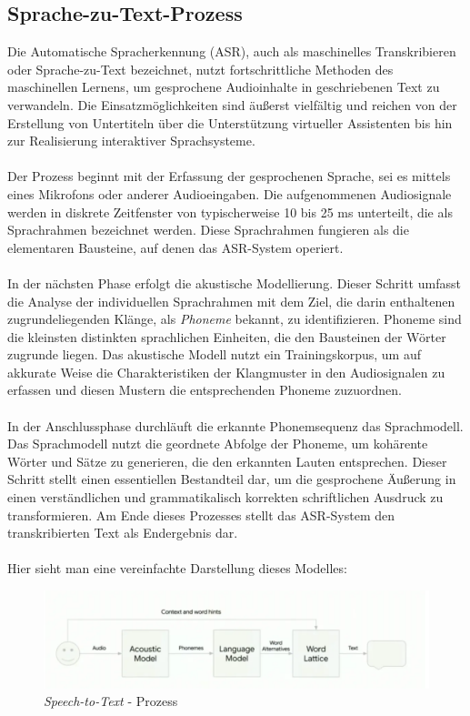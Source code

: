 \documentclass[12pt,a4paper]{article}
\begin{document}
\subsection{Sprache-zu-Text-Prozess}
Die Automatische Spracherkennung (ASR), auch als maschinelles Transkribieren oder Sprache-zu-Text bezeichnet, nutzt fortschrittliche Methoden des maschinellen Lernens, um gesprochene Audioinhalte in geschriebenen Text zu verwandeln. Die Einsatzmöglichkeiten sind äußerst vielfältig und reichen von der Erstellung von Untertiteln über die Unterstützung virtueller Assistenten bis hin zur Realisierung interaktiver Sprachsysteme.
\\ \\
Der Prozess beginnt mit der Erfassung der gesprochenen Sprache, sei es mittels eines Mikrofons oder anderer Audioeingaben. Die aufgenommenen Audiosignale werden in diskrete Zeitfenster von typischerweise 10 bis 25 ms unterteilt, die als Sprachrahmen bezeichnet werden. Diese Sprachrahmen fungieren als die elementaren Bausteine, auf denen das ASR-System operiert.
\\ \\
In der nächsten Phase erfolgt die akustische Modellierung. Dieser Schritt umfasst die Analyse der individuellen Sprachrahmen mit dem Ziel, die darin enthaltenen zugrundeliegenden Klänge, als \textit{Phoneme} bekannt, zu identifizieren. Phoneme sind die kleinsten distinkten sprachlichen Einheiten, die den Bausteinen der Wörter zugrunde liegen. Das akustische Modell nutzt ein Trainingskorpus, um auf akkurate Weise die Charakteristiken der Klangmuster in den Audiosignalen zu erfassen und diesen Mustern die entsprechenden Phoneme zuzuordnen.
\\ \\
In der Anschlussphase durchläuft die erkannte Phonemsequenz das Sprachmodell. Das Sprachmodell nutzt die geordnete Abfolge der Phoneme, um kohärente Wörter und Sätze zu generieren, die den erkannten Lauten entsprechen. Dieser Schritt stellt einen essentiellen Bestandteil dar, um die gesprochene Äußerung in einen verständlichen und grammatikalisch korrekten schriftlichen Ausdruck zu transformieren. Am Ende dieses Prozesses stellt das ASR-System den transkribierten Text als Endergebnis dar. 
\\ \\ 
Hier sieht man eine vereinfachte Darstellung dieses Modelles:
\begin{figure}[h!]
	\centering
	\includegraphics[width=1\linewidth]{../images/STT}
	\caption{\textit{Speech-to-Text} - Prozess}
	\label{fig:stt}
\end{figure}
\end{document}

